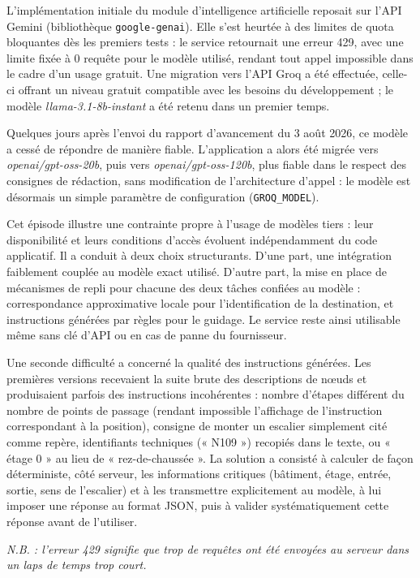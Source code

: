 \documentclass[12pt,a4paper]{report}
\begin{document}
L'implémentation initiale du module d'intelligence artificielle reposait sur l'API Gemini
(bibliothèque \texttt{google-genai}). Elle s'est heurtée à des limites de quota bloquantes dès les
premiers tests : le service retournait une erreur 429, avec une limite fixée à 0 requête pour le
modèle utilisé, rendant tout appel impossible dans le cadre d'un usage gratuit. Une migration vers
l'API Groq a été effectuée, celle-ci offrant un niveau gratuit compatible avec les besoins du
développement ; le modèle \emph{llama-3.1-8b-instant} a été retenu dans un premier temps.

Quelques jours après l'envoi du rapport d'avancement du 3 août 2026, ce modèle a cessé de répondre
de manière fiable. L'application a alors été migrée vers \emph{openai/gpt-oss-20b}, puis vers
\emph{openai/gpt-oss-120b}, plus fiable dans le respect des consignes de rédaction, sans
modification de l'architecture d'appel : le modèle est désormais un simple paramètre de
configuration (\texttt{GROQ\_MODEL}).

Cet épisode illustre une contrainte propre à l'usage de modèles tiers : leur disponibilité et leurs
conditions d'accès évoluent indépendamment du code applicatif. Il a conduit à deux choix
structurants. D'une part, une intégration faiblement couplée au modèle exact utilisé. D'autre part,
la mise en place de mécanismes de repli pour chacune des deux tâches confiées au modèle :
correspondance approximative locale pour l'identification de la destination, et instructions
générées par règles pour le guidage. Le service reste ainsi utilisable même sans clé d'API ou en
cas de panne du fournisseur.

Une seconde difficulté a concerné la qualité des instructions générées. Les premières versions
recevaient la suite brute des descriptions de nœuds et produisaient parfois des instructions
incohérentes : nombre d'étapes différent du nombre de points de passage (rendant impossible
l'affichage de l'instruction correspondant à la position), consigne de monter un escalier
simplement cité comme repère, identifiants techniques (« N109 ») recopiés dans le texte, ou
« étage 0 » au lieu de « rez-de-chaussée ». La solution a consisté à calculer de façon
déterministe, côté serveur, les informations critiques (bâtiment, étage, entrée, sortie, sens de
l'escalier) et à les transmettre explicitement au modèle, à lui imposer une réponse au format JSON,
puis à valider systématiquement cette réponse avant de l'utiliser.

\emph{N.B. : l'erreur 429 signifie que trop de requêtes ont été envoyées au serveur dans un laps de
temps trop court.}
\end{document}
